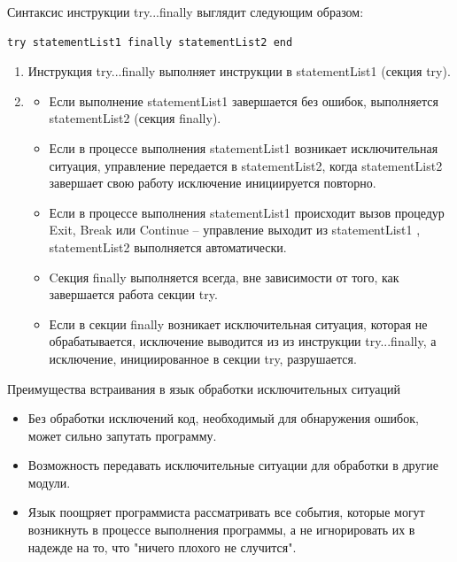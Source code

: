 \documentclass[xcolor=table]{beamer}
\begin{document}
\begin{frame}[fragile]
	Синтаксис инструкции try...finally выглядит следующим образом:
	\begin{verbatim}
try statementList1 finally statementList2 end
	\end{verbatim}
	\begin{enumerate}
		\item Инструкция try...finally выполняет инструкции в statementList1 (секция try). 
		\item 
			\begin{itemize}
				\item Если выполнение statementList1 завершается без ошибок, выполняется statementList2 (секция finally). 
				\item Если в процессе выполнения statementList1 возникает исключительная ситуация, управление передается в statementList2, когда statementList2 завершает свою работу исключение инициируется повторно. 
				\item Если в процессе выполнения statementList1 происходит вызов процедур Exit, Break или Continue – управление выходит из statementList1 , statementList2 выполняется автоматически.
				\item Cекция finally выполняется всегда, вне зависимости от того, как завершается работа секции try.
				\item Если в секции finally возникает исключительная ситуация, которая не обрабатывается, исключение выводится из из инструкции try...finally, а исключение, инициированное в секции try, разрушается. 
			\end{itemize}
	\end{enumerate}
\end{frame}

\begin{frame}{Преимущества встраивания в язык обработки исключительных ситуаций}
	\begin{itemize}
		\item Без обработки исключений код, необходимый для обнаружения ошибок, может сильно запутать программу. 
		\item Возможность передавать исключительные ситуации для обработки в другие модули.
		\item Язык поощряет программиста рассматривать все события, которые могут возникнуть в процессе выполнения программы, а не игнорировать их в надежде на то, что "ничего плохого не случится".
	\end{itemize}
\end{frame}
\end{document}
